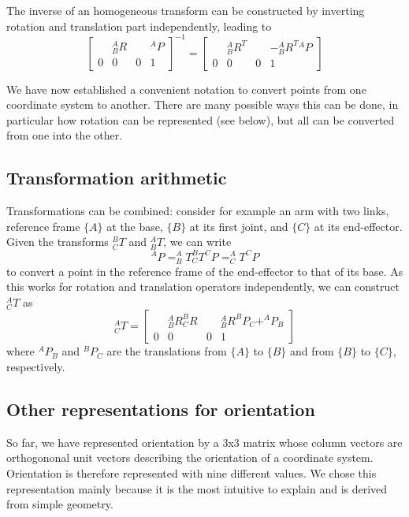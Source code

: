 The inverse of an homogeneous transform can be constructed by inverting rotation and translation part independently, leading to
\begin{equation}
\left[\begin{array}{ccc|c} & ^A_BR & & ^AP \\\hline 0 & 0 & 0 & 1\end{array}\right]^{-1}=
\left[\begin{array}{ccc|c} & ^A_BR^T & & -^A_B{R^T}{^AP} \\\hline 0 & 0 & 0 & 1\end{array}\right]
\end{equation}

We have now established a convenient notation to convert points from one coordinate system to another. There are many possible ways this can be done, in particular how rotation can be represented (see below), but all can be converted from one into the other.

\subsection{Transformation arithmetic}
Transformations can be combined: consider for example an arm with two links, reference frame $\{A\}$ at the base, $ \{B\} $ at its first joint, and $\{C\}$ at its end-effector. Given the transforms $ ^B_CT$ and $ ^A_BT$, we can write
\begin{equation}
^AP=^A_BT^B_CT^CP=^A_CT^CP
\end{equation}
to convert a point in the reference frame of the end-effector to that of its base. As this works for rotation and translation operators independently, we can construct $ ^A_CT$ as
\begin{equation}
^A_CT=\left[\begin{array}{ccc|c} & ^A_BR^B_CR & & ^A_BR^BP_C +^AP_B \\\hline 0 & 0 & 0 & 1\end{array}\right]
\end{equation}
%
where $ ^AP_B$ and $ ^BP_C$ are the translations from $\{A\}$ to $\{B\}$ and from $ \{B\}$ to $\{C\}$, respectively.

\subsection{Other representations for orientation}
So far, we have represented orientation by a 3x3 matrix whose column vectors are orthogononal unit vectors describing the orientation of a coordinate system. Orientation is therefore represented with nine different values. We chose this representation mainly because it is the most intuitive to explain and is derived from simple geometry.

